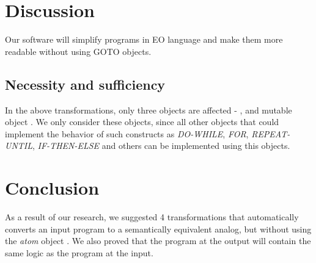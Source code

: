 \documentclass[sigplan,review,11pt,nonacm,natbib=false]{acmart}
\theoremstyle{theorems}
\begin{document}
\section{Discussion}

Our software will simplify programs in EO language and make them more readable without using GOTO objects.

\subsection{Necessity and sufficiency}

In the above transformations, only three objects are affected - ,  and mutable object .
We only consider these objects, since all other objects that could implement the behavior of such constructs as \emph{DO-WHILE}, \emph{FOR}, \emph{REPEAT-UNTIL}, \emph{IF-THEN-ELSE} and others can be implemented using this objects.

\section{Conclusion}

As a result of our research, we suggested 4 transformations that automatically converts an input program to a semantically equivalent analog, but without using the \emph{atom} object .
We also proved that the program at the output will contain the same logic as the program at the input.


\printbibliography %
\end{document}
